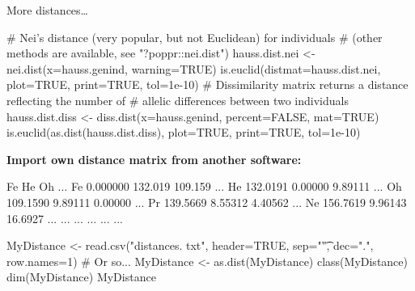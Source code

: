 \documentclass[compress, xelatex, 11pt, xcolor=svgnames, aspectratio=169,
	hyperref={
		bookmarks=true,
		unicode=true,
		colorlinks=true,
		pdftitle={Molecular data in R},
		plainpages=false,
		pdfauthor={Vojtech Zeisek},
		pdfsubject={Course about phylogeny and evolution in R},
		pdfcreator={XeLaTeX},
		pdfkeywords={R, evolution, phylogeny, molecular data},
		linkcolor=Crimson, %
		anchorcolor=Magenta, %
		citecolor=Magenta, %
		filecolor=Magenta, %
		menucolor=Magenta, %
		urlcolor=DodgerBlue, %
		},
	url={hyphens, lowtilde} %
	]{beamer}
\begin{document}
\begin{frame}[fragile]{More distances\ldots}
	\begin{spluscode}
    # Nei's distance (very popular, but not Euclidean) for individuals
    # (other methods are available, see "?poppr::nei.dist")
    hauss.dist.nei <- nei.dist(x=hauss.genind, warning=TRUE)
    is.euclid(distmat=hauss.dist.nei, plot=TRUE, print=TRUE, tol=1e-10)
    # Dissimilarity matrix returns a distance reflecting the number of
    # allelic differences between two individuals
    hauss.dist.diss <- diss.dist(x=hauss.genind, percent=FALSE, mat=TRUE)
    is.euclid(as.dist(hauss.dist.diss), plot=TRUE, print=TRUE, tol=1e-10)
	\end{spluscode}
	\vfill
	\textbf{Import own distance matrix from another software:}
	\begin{multicols}{2}
		\begin{spluscode}
              Fe      He      Oh ...
    Fe  0.000000 132.019 109.159 ...
    He  132.0191 0.00000 9.89111 ...
    Oh  109.1590 9.89111 0.00000 ...
    Pr  139.5669 8.55312 4.40562 ...
    Ne  156.7619 9.96143 16.6927 ...
    ...      ...     ...     ... ...
		\end{spluscode}
		\columnbreak
		\begin{spluscode}
    MyDistance <- read.csv("distances.
      txt", header=TRUE, sep="\t",
      dec=".", row.names=1) # Or so...
    MyDistance <- as.dist(MyDistance)
    class(MyDistance)
    dim(MyDistance)
    MyDistance
		\end{spluscode}
	\end{multicols}
\end{frame}
\end{document}
